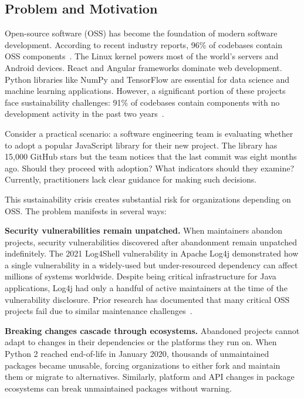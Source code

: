 \documentclass[conference]{IEEEtran}
\begin{document}
\subsection{Problem and Motivation}

Open-source software (OSS) has become the foundation of modern software development. According to recent industry reports, 96\% of codebases contain OSS components~\cite{synopsys2024}. The Linux kernel powers most of the world's servers and Android devices. React and Angular frameworks dominate web development. Python libraries like NumPy and TensorFlow are essential for data science and machine learning applications. However, a significant portion of these projects face sustainability challenges: 91\% of codebases contain components with no development activity in the past two years~\cite{synopsys2024}.

Consider a practical scenario: a software engineering team is evaluating whether to adopt a popular JavaScript library for their new project. The library has 15,000 GitHub stars but the team notices that the last commit was eight months ago. Should they proceed with adoption? What indicators should they examine? Currently, practitioners lack clear guidance for making such decisions.

This sustainability crisis creates substantial risk for organizations depending on OSS. The problem manifests in several ways:

\textbf{Security vulnerabilities remain unpatched.} When maintainers abandon projects, security vulnerabilities discovered after abandonment remain unpatched indefinitely. The 2021 Log4Shell vulnerability in Apache Log4j demonstrated how a single vulnerability in a widely-used but under-resourced dependency can affect millions of systems worldwide. Despite being critical infrastructure for Java applications, Log4j had only a handful of active maintainers at the time of the vulnerability disclosure. Prior research has documented that many critical OSS projects fail due to similar maintenance challenges~\cite{coelho2017}.

\textbf{Breaking changes cascade through ecosystems.} Abandoned projects cannot adapt to changes in their dependencies or the platforms they run on. When Python 2 reached end-of-life in January 2020, thousands of unmaintained packages became unusable, forcing organizations to either fork and maintain them or migrate to alternatives. Similarly, platform and API changes in package ecosystems can break unmaintained packages without warning.
\end{document}
